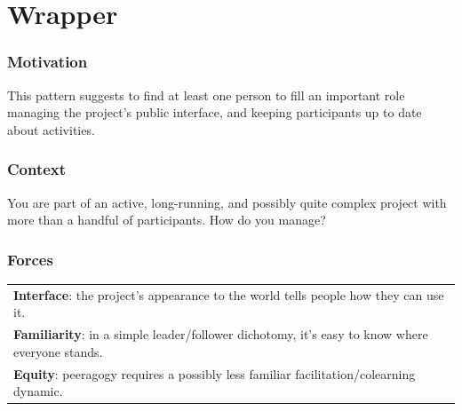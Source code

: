 
\section{Wrapper}\label{sec:Wrapper}
\subsubsection*{Motivation} This pattern suggests to find at least one person to fill an important role managing the project's public interface, and keeping participants up to date about activities.



\subsubsection*{Context} You are part of an active, long-running, and possibly quite complex project with more than a handful of participants.  How do you manage?

\subsubsection*{Forces}
\raisebox{-2.5\baselineskip}
{{\centering
\begin{tabular}{p{}}
\textbf{Interface}: the project's appearance to the world tells people how they can use it.\\
\textbf{Familiarity}: in a simple leader/follower dichotomy, it's easy to know where everyone stands.\\
\textbf{Equity}: peeragogy requires a possibly less familiar facilitation/colearning dynamic.\\
\end{tabular}
}}

